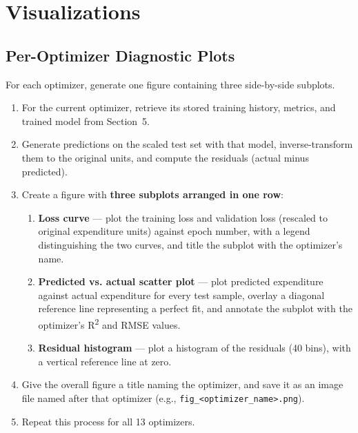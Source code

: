 \documentclass[12pt,a4paper]{article}
\begin{document}
\section{Visualizations}

\subsection{Per-Optimizer Diagnostic Plots}

For each optimizer, generate one figure containing three side-by-side subplots.

\begin{stepbox}
\begin{enumerate}[leftmargin=*, label=\arabic*.]
  \item For the current optimizer, retrieve its stored training history, metrics, and
        trained model from Section~5.
  \item Generate predictions on the scaled test set with that model, inverse-transform
        them to the original units, and compute the residuals (actual minus predicted).
  \item Create a figure with \textbf{three subplots arranged in one row}:
  \begin{enumerate}[leftmargin=*, label=(\alph*)]
    \item \textbf{Loss curve} — plot the training loss and validation loss (rescaled
          to original expenditure units) against epoch number, with a legend
          distinguishing the two curves, and title the subplot with the optimizer's name.
    \item \textbf{Predicted vs. actual scatter plot} — plot predicted expenditure
          against actual expenditure for every test sample, overlay a diagonal
          reference line representing a perfect fit, and annotate the subplot with
          the optimizer's R\textsuperscript{2} and RMSE values.
    \item \textbf{Residual histogram} — plot a histogram of the residuals (40 bins),
          with a vertical reference line at zero.
  \end{enumerate}
  \item Give the overall figure a title naming the optimizer, and save it as an image
        file named after that optimizer (e.g., \texttt{fig\_<optimizer\_name>.png}).
  \item Repeat this process for all 13 optimizers.
\end{enumerate}
\end{stepbox}
\end{document}
